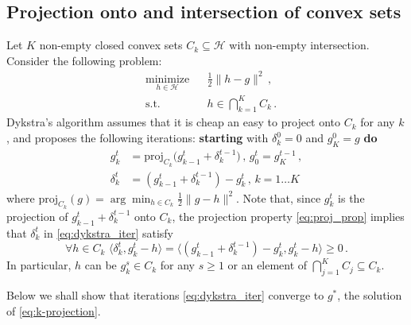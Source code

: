 \documentclass[a4paper]{article}
\newcommand{\Hcal}{\mathcal{H}}
\begin{document}

\subsection*{Projection onto and intersection of convex sets} %
\label{sub:projection_onto_and_intersection_of_convex_sets}

Let $K$ non-empty closed convex sets $C_k \subseteq \Hcal$ with non-empty intersection.
Consider the following problem:
\begin{equation} \label{eq:k-projection}  %
  \begin{aligned}
    & \underset{h \in \Hcal}{\text{minimize}}
      & & \tfrac12 \|h - g\|^2
          \,, \\
    & \text{s.t.}
      & & h \in \bigcap_{k=1}^K C_k
          \,.
  \end{aligned}
\end{equation}
Dykstra's algorithm assumes that it is cheap an easy to project onto $C_k$ for any $k$,
and proposes the following iterations: {\bf starting} with $\delta^0_k = 0$ and $g^0_K = g$
{\bf do}
\begin{equation} \label{eq:dykstra_iter}  %
  \begin{aligned}
    g^t_k
      &= \mathrm{proj}_{C_k}\bigl( g^t_{k-1} + \delta^{t-1}_k \bigr)
      \,,
      \, g^t_0 = g^{t-1}_K
      \,, \\
    \delta^t_k
      &= (g^t_{k-1} + \delta^{t-1}_k) - g^t_k
      \,,
      \, k = 1\ldots K
  \end{aligned}
\end{equation}
where $\mathrm{proj}_{C_k}(g) = \arg\min_{h \in C_k} \tfrac12 \|g - h\|^2$. Note
that, since $g^t_k$ is the projection of $g^t_{k-1} + \delta^{t-1}_k$ onto $C_k$,
the projection property \eqref{eq:proj_prop} implies that $\delta^t_k$ in
\eqref{eq:dykstra_iter} satisfy
\begin{equation} \label{eq:dykstra_prop}
  \forall{h\in C_k}
  \,\,
  \langle \delta^t_k, g^t_k - h \rangle
  = \bigl\langle (g^t_{k-1} + \delta^{t-1}_k) - g^t_k, g^t_k - h \bigr \rangle
  \geq 0
  \,.
\end{equation}
In particular, $h$ can be $g^s_k \in C_k$ for any $s\geq 1$ or an element of
$\bigcap_{j=1}^K C_j \subseteq C_k$.

Below we shall show that iterations \eqref{eq:dykstra_iter} converge to $g^*$, the
solution of \eqref{eq:k-projection}.
\end{document}
